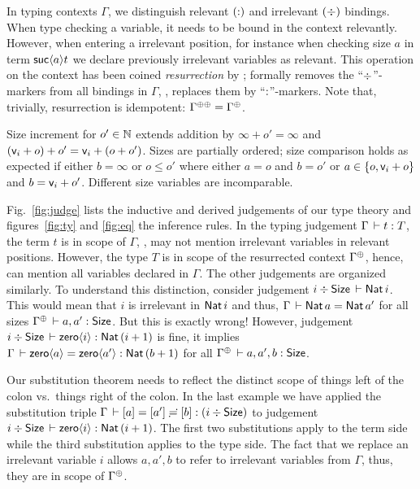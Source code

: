 \documentclass[acmlarge,review,anonymous]{acmart}\settopmatter{printfolios=true}
\begin{document}


In typing contexts $\Gamma$, we distinguish relevant $(\mathord{:})$ and irrelevant $(\mathord{\div})$ bindings.
When type checking a variable, it needs to be bound in the context relevantly.  However, when entering a irrelevant position, for instance when checking size $a$ in term $\mathsf{suc}\langle a\rangle t$ we declare previously irrelevant variables as relevant.
This operation on the context has been coined
\emph{resurrection} by \citet{pfenning:lics01}; formally \fbox{$\resurrect\Gamma$} removes
the ``$\mathord{\div}$''-markers from all bindings in $\Gamma$, \ie, replaces
them by ``$\mathord{:}$''-markers.  Note that, trivially, resurrection is idempotent: $\resurrecttwice\Gamma = \resurrect{\Gamma}$.

Size increment  for $o' \in \mathbb{N}$ extends addition by $\infty + o' = \infty$ and $(\mathsf{v}_{i} + o) + o' = \mathsf{v}_{i} + (o + o')$.  Sizes are partially ordered; size comparison  holds as expected if either $b = \infty$ or  $o \leq o'$ where either $a = o$ and $b = o'$ or $a \in \{ o, \mathsf{v}_{i} + o \}$ and $b = \mathsf{v}_{i} + o'$.
Different size variables are incomparable.




Fig.~\ref{fig:judge} lists the inductive and derived judgements of our type theory and
figures~\ref{fig:ty} and \ref{fig:eq} the inference rules.
In the typing judgement $\Gamma \,\vdash t : T$, the term $t$ is in scope of
$\Gamma$, \ie, may not mention irrelevant variables in relevant
positions.  However, the type $T$ is in scope of the resurrected
context $\resurrect\Gamma$, hence, can mention all variables declared
in $\Gamma$.  The other judgements are organized similarly.  To
understand this distinction, consider judgement
$i \div \mathsf{Size} \,\vdash \mathsf{Nat}\, i$.  This would mean that $i$ is irrelevant in
$\mathsf{Nat}\, i$ and thus, $\Gamma \,\vdash \mathsf{Nat}\, a = \mathsf{Nat}\, {a'}$ for all sizes
$\resurrect\Gamma \der a,a' : \Size$.  But this is exactly wrong!  However,
judgement $i \div \mathsf{Size} \,\vdash \mathsf{zero}\langle i\rangle : \mathsf{Nat}\, (i + 1)$ is fine, it
implies $\Gamma \,\vdash \mathsf{zero}\langle a\rangle = \mathsf{zero}\langle a'\rangle : \mathsf{Nat}\, (b+1)$ for all
$\resurrect\Gamma \der a,a',b : \Size$.

Our substitution theorem
needs to reflect the distinct scope of things left of the colon vs.\
things right of the colon.  In the last example we have applied the
substitution triple $\Gamma \,\vdash [a] = [a'] \risingdotseq [b] : (i \div \mathsf{Size})$
to judgement $i \div \mathsf{Size} \,\vdash \mathsf{zero}\langle i\rangle : \mathsf{Nat}\, (i + 1)$.
The first two substitutions apply to the term side while the third
substitution applies to the type side.  The fact that we replace an
irrelevant variable $i$ allows $a,a',b$ to refer to irrelevant
variables from $\Gamma$, thus, they are in scope of $\resurrect\Gamma$.
\end{document}
